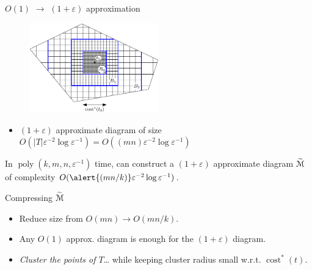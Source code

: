 \documentclass[xcolor={dvipsnames,usenames}]{beamer}
\newcommand{\eps}{\varepsilon}
\DeclareMathOperator{\poly}{poly}
\def\abs#1{\mathopen| #1 \mathclose|}		%
\DeclareMathOperator{\cost}{cost}
\newcommand{\tildeM}{\widetilde{\EuScript{M}}}
\def\EMPH#1{\textcolor{BrickRed}{{\emph{#1}}}}
\begin{document}
\begin{frame}{$O(1)$ $\rightarrow$ $(1+\eps)$ approximation}
\begin{figure}
\begin{center}
\includegraphics[width=0.5\textwidth,page=1]{nested-grid-crop}%
\end{center}
\end{figure}
\begin{itemize}
\item $(1+\eps)$ approximate diagram of size
	$O(\abs{T}\eps^{-2}\log\eps^{-1}) = O((mn)\eps^{-2}\log\eps^{-1})$
\end{itemize}
\begin{theorem}
In $\poly(k, m, n, \eps^{-1})$ time, can construct a $(1+\eps)$ approximate
diagram $\tildeM$ of complexity $O(\alert{(mn/k)}\eps^{-2}\log\eps^{-1})$.
\end{theorem}
\end{frame}

\begin{frame}{Compressing $\tildeM$}
\begin{itemize}
\item Reduce size from $O(mn) \rightarrow O(mn/k)$.
\item Any $O(1)$ approx. diagram is enough for the $(1+\eps)$ diagram.
\item \EMPH{Cluster the points of $T$}\ldots
	while keeping cluster radius small w.r.t. $\cost^*(t)$.
\end{itemize}
\end{frame}
\end{document}
